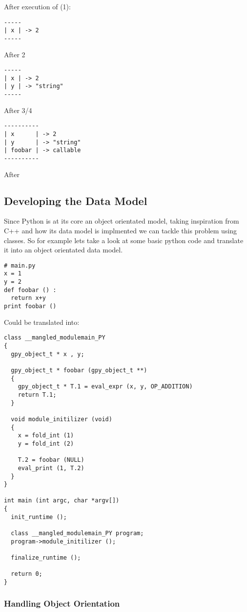 \documentclass[defaultstyle,11pt]{article}
\begin{document}
After execution of (1):

\begin{lstlisting}
-----
| x | -> 2
-----
\end{lstlisting}

After 2

\begin{lstlisting}
-----
| x | -> 2
| y | -> "string"
-----
\end{lstlisting}

After 3/4

\begin{lstlisting}
----------
| x      | -> 2
| y      | -> "string"
| foobar | -> callable
----------
\end{lstlisting}

After

\subsection{Developing the Data Model}
Since Python is at its core an object orientated model, taking inspiration from C++ and how its
data model is implmented we can tackle this problem using classes. So for example lets take a look at some
basic python code and translate it into an object orientated data model.

\begin{lstlisting}
# main.py
x = 1
y = 2
def foobar () :
  return x+y
print foobar ()
\end{lstlisting}

Could be translated into:

\begin{lstlisting}
class __mangled_modulemain_PY
{
  gpy_object_t * x , y;

  gpy_object_t * foobar (gpy_object_t **)
  {
    gpy_object_t * T.1 = eval_expr (x, y, OP_ADDITION)
    return T.1;
  }

  void module_initilizer (void)
  {
    x = fold_int (1)
    y = fold_int (2)

    T.2 = foobar (NULL)
    eval_print (1, T.2)
  }
}

int main (int argc, char *argv[])
{
  init_runtime ();
  
  class __mangled_modulemain_PY program;
  program->module_initilizer ();
  
  finalize_runtime ();

  return 0;
}
\end{lstlisting}

\subsubsection{Handling Object Orientation}
\end{document}
